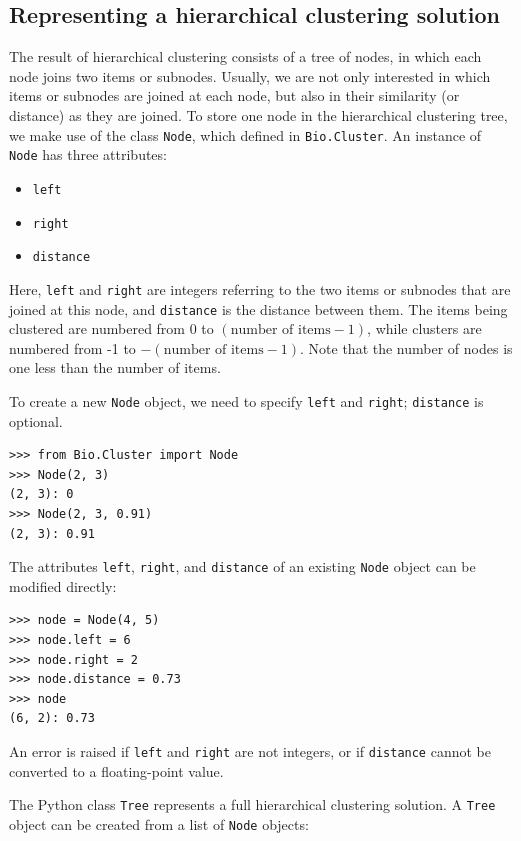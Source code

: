 \documentclass{report}
\begin{document}
\subsection*{Representing a hierarchical clustering solution}

The result of hierarchical clustering consists of a tree of nodes, in which each node joins two items or subnodes. Usually, we are not only interested in which items or subnodes are joined at each node, but also in their similarity (or distance) as they are joined. To store one node in the hierarchical clustering tree, we make use of the class \verb|Node|, which defined in \verb|Bio.Cluster|. An instance of \verb|Node| has three attributes:
\begin{itemize}
\item \verb|left|
\item \verb|right|
\item \verb|distance|
\end{itemize}
Here, \verb|left| and \verb|right| are integers referring to the two items or subnodes that are joined at this node, and \verb|distance| is the distance between them. The items being clustered are numbered from 0 to $\left(\textrm{number of items} - 1\right)$, while clusters are numbered from -1 to $-\left(\textrm{number of items}-1\right)$.  Note that the number of nodes is one less than the number of items.

To create a new \verb|Node| object, we need to specify \verb|left| and \verb|right|; \verb|distance| is optional.

\begin{verbatim}
>>> from Bio.Cluster import Node
>>> Node(2, 3)
(2, 3): 0
>>> Node(2, 3, 0.91)
(2, 3): 0.91
\end{verbatim}

The attributes \verb|left|, \verb|right|, and \verb|distance| of an existing \verb|Node| object can be modified directly:

\begin{verbatim}
>>> node = Node(4, 5)
>>> node.left = 6
>>> node.right = 2
>>> node.distance = 0.73
>>> node
(6, 2): 0.73
\end{verbatim}
An error is raised if \verb|left| and \verb|right| are not integers, or if \verb|distance| cannot be converted to a floating-point value.

The Python class \verb|Tree| represents a full hierarchical clustering solution. A \verb|Tree| object can be created from a list of \verb|Node| objects:
\end{document}
